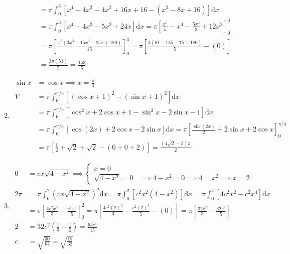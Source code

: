 \documentclass[12pt, A4]{report}
\renewcommand{\d}{\text{d}}
\begin{document}
\begin{enumerate}
\begin{align*}
							&= \pi\int_0^3\left[x^4 - 4x^3 - 4x^2 + 16x + 16 - \left(x^2 - 8x + 16\right)\right]\d x \\
							&= \pi\int_0^3\left[x^4 - 4x^3 - 5x^2 + 24x\right]\d x
								= \pi\left[\frac{x^5}{5} - x^4 - \frac{5x^3}{3} + 12x^2\right]_0^3 \\
							&= \pi\left[\frac{x^2\left(3x^3 - 15x^2 - 25x + 180\right)}{15}\right]_0^3
								= \pi\left[\frac{3(81 - 135 - 75 + 180)}{5} - (0)\right] \\
							&= \frac{3\pi(51)}{5} = \frac{153}{5}
					\end{align*}
				\item
					\begin{align*}
						\sin x &= \cos x 
								\implies x = \frac{\pi}{4} \\
						V &= \pi\int_0^{\pi/4}\left[(\cos x + 1)^2 - (\sin x + 1)^2\right]\d x \\
							&= \pi\int_0^{\pi/4}\left[\cos^2x + 2\cos x + 1 - \sin^2 x - 2\sin x - 1\right]\d x \\
							&= \pi\int_0^{\pi/4}\left[\cos(2x) + 2\cos x - 2\sin x\right]\d x
								= \pi\left[\frac{\sin(2x)}{2} + 2\sin x + 2\cos x\right]_0^{\pi/4} \\
							&= \pi\left[\frac{1}{2} + \sqrt{2} + \sqrt{2} - (0 + 0 + 2)\right]
								= \frac{(4\sqrt{2} - 3)\pi}{2}
					\end{align*}								
				\item
					\begin{align*}
						0 &= cx\sqrt{4 - x^2} \implies 
							\begin{cases}
	 							x = 0 \\
	 							\sqrt{4 - x^2} = 0 &\implies 4 - x^2 = 0 
	 								\implies 4 = x^2 
	 								\implies x = 2
							\end{cases} \\
						2\pi &= \pi\int_0^2\left(cx\sqrt{4 - x^2}\right)^2\d x
									= \pi\int_0^2\left[c^2x^2(4 - x^2)\right]\d x
									= \pi\int_0^4\left[4c^2x^2 - c^2x^4\right]\d x \\
								&= \pi\left[\frac{4c^2x^3}{3} - \frac{c^2x^5}{5}\right]_0^2
									= \pi\left[\frac{4c^2(2)^3}{3} - \frac{c^2(2)^5}{5} - (0)\right]
									= \pi\left[\frac{32c^2}{3} - \frac{32c^2}{5}\right] \\
							2 &= 32c^2\left(\frac{1}{3} - \frac{1}{5}\right) 
									= \frac{64c^2}{15} \\
							c &= \sqrt{\frac{30}{64}} = \sqrt{\frac{15}{32}}
					\end{align*}

\end{enumerate}
\end{document}
